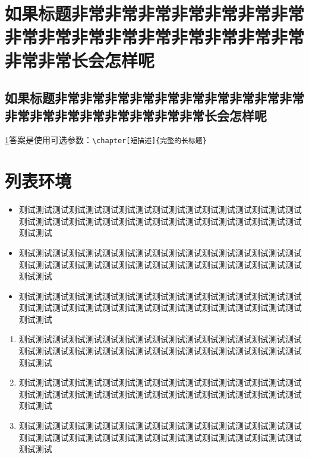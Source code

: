 \documentclass{njuthesis}
\begin{document}
\maketitle




\raggedbottom

\tableofcontents
\listoffigures
\listoftables

\mainmatter

\chapter[非常长的标题不好看]{如果标题非常非常非常非常非常非常非常非常非常非常非常非常非常非常非常非常非常非常长会怎样呢}
\label{ch:longtitle}
\section[还是用短点的吧]{如果标题非常非常非常非常非常非常非常非常非常非常非常非常非常非常非常非常非常非常长会怎样呢}
\cref{ch:longtitle}答案是使用可选参数：\verb+\chapter[短描述]{完整的长标题}+

\zhlipsum[1-10][name=zhufu]

\chapter{列表环境}

\begin{itemize}
    \item 测试测试测试测试测试测试测试测试测试测试测试测试测试测试测试测试测试测试测试测试测试测试测试测试测试测试测试测试测试测试测试测试测试测试测试测试
    \item 测试测试测试测试测试测试测试测试测试测试测试测试测试测试测试测试测试测试测试测试测试测试测试测试测试测试测试测试测试测试测试测试测试测试测试测试
    \item 测试测试测试测试测试测试测试测试测试测试测试测试测试测试测试测试测试测试测试测试测试测试测试测试测试测试测试测试测试测试测试测试测试测试测试测试
\end{itemize}

\begin{enumerate}
    \item 测试测试测试测试测试测试测试测试测试测试测试测试测试测试测试测试测试测试测试测试测试测试测试测试测试测试测试测试测试测试测试测试测试测试测试测试
    \item 测试测试测试测试测试测试测试测试测试测试测试测试测试测试测试测试测试测试测试测试测试测试测试测试测试测试测试测试测试测试测试测试测试测试测试测试
    \item 测试测试测试测试测试测试测试测试测试测试测试测试测试测试测试测试测试测试测试测试测试测试测试测试测试测试测试测试测试测试测试测试测试测试测试测试
\end{enumerate}
\end{document}
